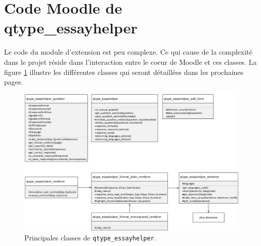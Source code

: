 \section{Code Moodle de qtype\_essayhelper}
Le code du module d'extension est peu complexe.
Ce qui cause de la complexit\'e dans le projet r\'eside dans l'interaction entre le coeur de Moodle et ces classes.
La figure \ref{dev-class} illustre les diff\'erentes classes qui seront d\'etaill\'ees dans les prochaines pages.
\begin{figure}[h!]
  \includegraphics[scale=0.5]{images/class.png}
  \caption{Principales classes de \texttt{qtype\_essayhelper}.}
  \label{dev-class}
\end{figure}
